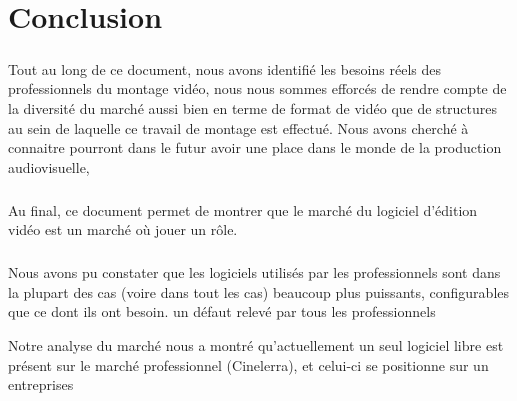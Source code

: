 \newpage \chapter{Conclusion}

\paragraph{}

Tout au long de ce document, nous avons identifié les besoins réels
des professionnels du montage vidéo, nous nous sommes efforcés de rendre
compte de la diversité du marché aussi bien en terme de format de
vidéo que de structures au sein de laquelle ce travail de montage est
effectué. Nous avons  cherché à connaitre %
pourront dans le futur avoir une place dans le monde de la production
audiovisuelle, %

\paragraph{}

Au final, ce document permet de montrer que le marché du logiciel
d'édition vidéo est un marché où %
jouer un rôle. %

\paragraph{}

Nous avons pu constater que les logiciels utilisés par les professionnels
sont dans la plupart des cas (voire dans tout les cas) beaucoup plus
puissants, configurables que ce dont ils ont besoin. %
un défaut relevé par tous les professionnels %

Notre analyse du marché nous a montré qu'actuellement un seul logiciel
libre est présent sur le marché professionnel (Cinelerra), et celui-ci
se positionne sur un %
entreprises %

